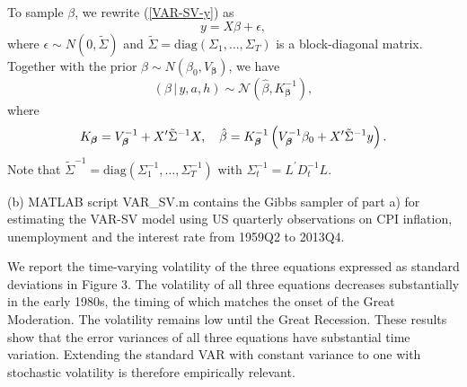 \documentclass{article}
\begin{document}
To sample $\beta $, we rewrite (\ref{VAR-SV-y}) as 
\begin{equation*}
y=X\beta +\epsilon ,
\end{equation*}%
where $\epsilon \sim N(0,\tilde{\Sigma })$ and $\tilde{\Sigma }=\text{diag}%
(\Sigma _{1},\ldots ,\Sigma _{T})$ is a block-diagonal matrix. Together with
the prior $\beta \sim N(\beta _{0},V_{\boldsymbol{\beta }})$, we have 
\begin{equation*}
(\beta \,|\,y,a,h)\sim {\mathcal{N}}(\hat{\beta },K_{\boldsymbol{\beta }%
}^{-1}),
\end{equation*}%
where 
\begin{equation*}
K_{\boldsymbol{\beta }}=V_{\boldsymbol{\beta }}^{-1}+X^{\prime }\tilde{%
\Sigma }^{-1}X,\quad \hat{\beta }=K_{\boldsymbol{\beta }}^{-1}\left( V_{%
\boldsymbol{\beta }}^{-1}\beta _{0}+X^{\prime }\tilde{\Sigma }^{-1}y\right) .
\end{equation*}%
Note that $\tilde{\Sigma }^{-1}=\text{diag}(\Sigma _{1}^{-1},\ldots ,\Sigma
_{T}^{-1})$ with $\Sigma _{t}^{-1}=L^{\prime }D_{t}^{-1}L$.

(b) MATLAB script VAR\_SV.m contains the Gibbs sampler of part a) for
estimating the VAR-SV model using US quarterly observations on CPI
inflation, unemployment and the interest rate from 1959Q2 to 2013Q4.

We report the time-varying volatility of the three equations expressed as
standard deviations in Figure 3. The volatility of all three equations
decreases substantially in the early 1980s, the timing of which matches the
onset of the Great Moderation. The volatility remains low until the Great
Recession. These results show that the error variances of all three
equations have substantial time variation. Extending the standard VAR with
constant variance to one with stochastic volatility is therefore empirically
relevant.

\end{document}
